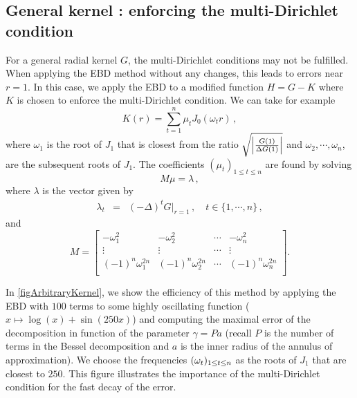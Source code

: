 \documentclass[main]{subfiles}
\begin{document}
\subsection{General kernel : enforcing the multi-Dirichlet condition}
\label{begal1}
For a general radial kernel $G$, the multi-Dirichlet conditions may not be fulfilled. When applying the EBD method without any changes, this leads to errors near $r=1$. In this case, we apply the EBD to a modified function $H = G - K$ where $K$ is chosen to enforce the multi-Dirichlet condition. We can take for example
\[K(r) = \sum_{t=1}^{n} \mu_t J_0(\omega_t r)\,,\]
where $\omega_1$ is the root of $J_1$ that is closest from the ratio $\sqrt{\left\lvert \frac{G(1)}{\Delta G(1)} \right\rvert}$ and $\omega_2, \cdots, \omega_n$, are the subsequent roots of $J_1$. The coefficients $(\mu_t)_{1 \leq t \leq n}$ are found by solving
\[M\mu = \lambda\,,\]
where $\lambda$ is the vector given by
\begin{eqnarray*}
	\lambda_t &=& (-\Delta)^t G \big|_{r=1}\,, \quad t\in \{1,\cdots,n\}\,,
\end{eqnarray*}
and
\[M=
\begin{bmatrix}
-\omega_1^2          & -\omega_2^2          & \cdots & -\omega_n^2          \\
\vdots               & \vdots               & \cdots & \vdots               \\
(-1)^n \omega_1^{2n} & (-1)^n \omega_2^{2n} & \cdots & (-1)^n \omega_n^{2n} \\ 
\end{bmatrix}.
\]
\vspace{5pt}

In \autoref{figArbitraryKernel}, we show the efficiency of this method by applying the EBD with $100$ terms to some highly oscillating function ($x \mapsto \log(x) + \sin(250x)$) and computing the maximal error of the decomposition in function of the parameter $\gamma = Pa$ (recall $P$ is the number of terms in the Bessel decomposition and $a$ is the inner radius of the annulus of approximation). We choose the frequencies $(\omega_{t})_{1 \leq t \leq n}$ as the roots of $J_1$ that are closest to $250$. This figure illustrates the importance of the multi-Dirichlet condition for the fast decay of the error. 
\end{document}
